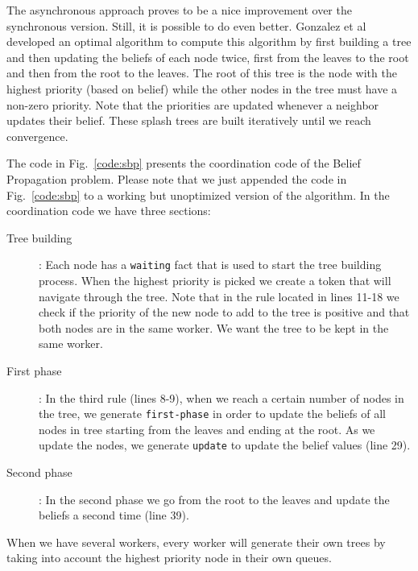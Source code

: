 The asynchronous approach proves to be a nice improvement over the synchronous version. Still, it
is possible to do even better. Gonzalez et al~\cite{Gonzalez+al:aistats09paraml} developed an optimal
algorithm to compute this algorithm by first building a tree and then updating the beliefs of each node twice, first from the leaves to the root and then from the root to the leaves. The root of this tree
is the node with the highest priority (based on belief) while the other nodes in the tree
must have a non-zero priority. Note that the priorities are updated whenever a neighbor updates
their belief. These splash trees are built iteratively until we reach convergence.

The code in Fig.~\ref{code:sbp} presents the coordination code of the Belief Propagation problem.
Please note that we just appended the code in Fig.~\ref{code:sbp} to a working but
unoptimized version of the algorithm.
In the coordination code we have three sections:
\begin{description}
   \item[Tree building]: Each node has a \texttt{waiting} fact that is used to start the tree building process. When the highest priority is picked we create a token that will navigate through the tree. Note that in the rule located in lines 11-18 we check if the priority of the new node to add to the tree is positive and that both nodes are in the same worker. We want the tree to be kept in the same worker.
   \item[First phase]: In the third rule (lines 8-9), when we reach a certain number of nodes in the tree, we generate \texttt{first-phase} in order to update the beliefs of all nodes in tree starting from the leaves and ending at the root. As we update the nodes, we generate \texttt{update} to update the belief values (line 29).
   \item[Second phase]: In the second phase we go from the root to the leaves and update the beliefs a second time (line 39).
\end{description}

When we have several workers, every worker will generate their own trees by taking into account the highest priority node in their own queues.

